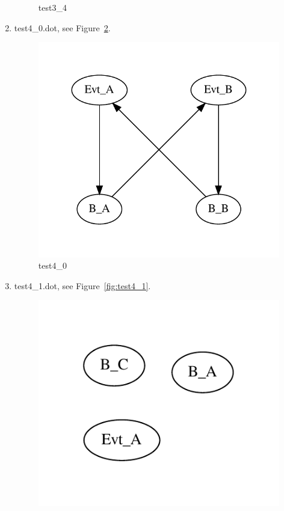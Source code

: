 \documentclass[12pt,a4paper]{report}
\begin{document}
\begin{enumerate}
\begin{figure}
        \caption{test3\_4}
        \label{fig:test3_4}
    \end{figure}
\item test4\_0.dot, see Figure~\ref{fig:test4_0}.
    \begin{figure}
        \centering
        \includegraphics*[width=1.0\textwidth,keepaspectratio]{TestPattern/test4_0.pdf}
        \caption{test4\_0}
        \label{fig:test4_0}
    \end{figure}
\item test4\_1.dot, see Figure~\ref{fig:test4_1}.
    \begin{figure}
        \centering
        \includegraphics*[width=1.0\textwidth,keepaspectratio]{TestPattern/test4_1.pdf}

\end{figure}
\end{enumerate}
\end{document}
